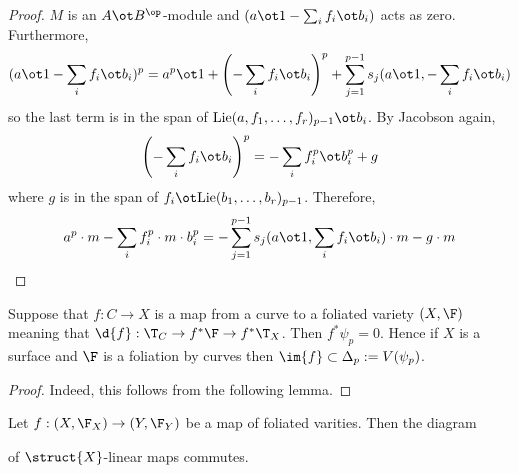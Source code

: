 \documentclass[12pt]{article}
\begin{document}
\begin{proof}
$M$ is an $A \ot B^\op$-module and $(a \ot 1 - \sum_i f_i \ot b_i)$ acts as zero. Furthermore,
\[ (a \ot 1 - \sum_i f_i \ot b_i)^p = a^p \ot 1 + \left(- \sum_i f_i \ot b_i \right)^p + \sum_{j = 1}^{p-1} s_j(a \ot 1, -\sum_i f_i \ot b_i) \]
so the last term is in the span of $\Lie(a, f_1, \dots, f_r)_{p-1} \ot b_i$. By Jacobson again,
\[  \left(- \sum_i f_i \ot b_i \right)^p = - \sum_i f_i^p \ot b_i^p + g \]
where $g$ is in the span of $f_i \ot \Lie(b_1, \dots, b_r)_{p-1}$. Therefore,
\[ a^p \cdot m - \sum_i f_i^p \cdot m \cdot b_i^p = -\sum_{j = 1}^{p-1} s_j(a \ot 1, \sum_i f_i \ot b_i) \cdot m  -g \cdot m \]
\end{proof}

\begin{prop}
Suppose that $f : C \to X$ is a map from a curve to a foliated variety $(X, \F)$ meaning that $\d{f} : \T_C \to f^* \F \to f^* \T_X$. Then $f^* \psi_p = 0$. Hence if $X$ is a surface and $\F$ is a foliation by curves then $\im{f} \subset \Delta_p := V(\psi_p)$.
\end{prop}

\begin{proof}
Indeed, this follows from the following lemma.
\end{proof}

\begin{prop}
Let $f : (X, \F_X) \to (Y, \F_Y)$ be a map of foliated varities. Then the diagram
\begin{center}
\end{center}
of $\struct{X}$-linear maps commutes.
\end{prop}
\end{document}

